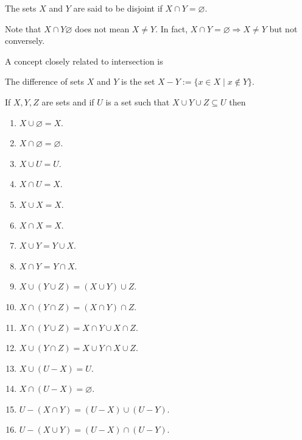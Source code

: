\begin{defn}\label{c2s1d4}
The sets $X$ and $Y$ are said to be disjoint if $X \cap Y = \varnothing$.
\end{defn}
Note that $X \cap Y \varnothing$ does not mean $X \ne Y$. In fact, $X
\cap Y = \varnothing \Rightarrow X \ne Y$ but not conversely.

A concept closely related to intersection is
\begin{defn}\label{c2s1d5}
The difference of sets $X$ and $Y$ is the set $X - Y := \{x \in X
\;|\; x \notin Y\}$.
\end{defn}

\begin{prop}\label{c2s1p1}
If $X, Y, Z$ are sets and if $U$ is a set such that $X \cup Y \cup Z 
\subseteq U$ then
\begin{enumerate}
\item $X \cup \varnothing = X$.
\item $X \cap \varnothing = \varnothing$.
\item $X \cup U = U$.
\item $X \cap U = X$.
\item $X \cup X = X$.
\item $X \cap X = X$.
\item $X \cup Y = Y \cup X$.
\item $X \cap Y$ = $Y \cap X$.
\item $X \cup (Y \cup Z) = (X \cup Y) \cup Z$.
\item $X \cap (Y \cap Z) = (X \cap Y) \cap Z$.
\item $X \cap (Y \cup Z) = X \cap Y \cup X \cap Z$.
\item $X \cup (Y \cap Z) = X \cup Y \cap X \cup Z$.
\item $X \cup (U - X) = U$.
\item $X \cap (U - X) = \varnothing$.
\item $U - (X \cap Y) = (U - X) \cup (U - Y)$.
\item $U - (X \cup Y) = (U - X) \cap (U - Y)$.
\end{enumerate}
\end{prop}

